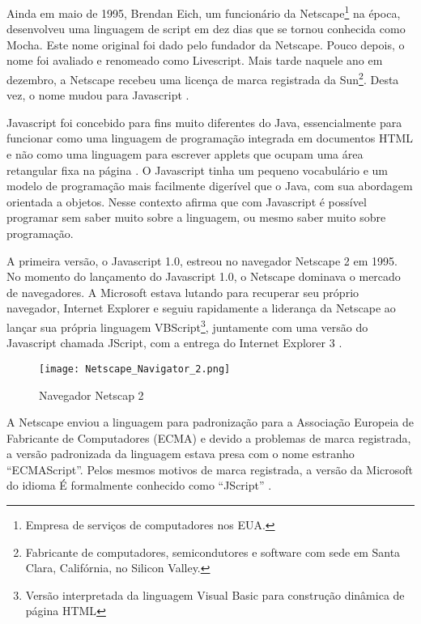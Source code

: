 Ainda em maio de 1995, Brendan Eich, um funcionário da Netscape\footnote{Empresa de serviços de computadores nos EUA.} na época, desenvolveu uma linguagem de script em dez dias que se tornou conhecida como Mocha. Este nome original foi dado pelo fundador da Netscape. Pouco depois, o nome foi avaliado e renomeado como Livescript. Mais tarde naquele ano em dezembro, a Netscape recebeu uma licença de marca registrada da Sun\footnote{Fabricante de computadores, semicondutores e software com sede em Santa Clara, Califórnia, no Silicon Valley.}. Desta vez, o nome mudou para Javascript \cite{neer2013history}.

Javascript foi concebido para fins muito diferentes do Java, essencialmente para funcionar como uma linguagem de programação integrada em documentos HTML e não como uma linguagem para escrever applets que ocupam uma área retangular fixa na página \cite{goodman2007javascript}. O Javascript tinha um pequeno vocabulário e um modelo de programação mais facilmente digerível que o Java, com sua abordagem orientada a objetos. Nesse contexto  afirma que com Javascript é possível programar sem saber muito sobre a linguagem, ou mesmo saber muito sobre programação.

A primeira versão, o Javascript 1.0, estreou no navegador Netscape 2 em 1995. No momento do lançamento do Javascript 1.0, o Netscape dominava o mercado de navegadores. A Microsoft estava lutando para recuperar seu próprio navegador, Internet Explorer e seguiu rapidamente a liderança da Netscape ao lançar sua própria linguagem VBScript\footnote{Versão interpretada da linguagem Visual Basic para construção dinâmica de página HTML}, juntamente com uma versão do Javascript chamada JScript, com a entrega do Internet Explorer 3 \cite{keith2010dom}.

\begin{figure}[!htb]
	\centering
	\texttt{[image: Netscape\_Navigator\_2.png]}
	\caption{Navegador Netscap 2}
	\label{fig:netscape}
\end{figure}

A Netscape enviou a linguagem para padronização para a Associação Europeia de Fabricante de Computadores (ECMA) e devido a problemas de marca registrada, a versão padronizada da linguagem estava presa com o nome estranho “ECMAScript”. Pelos mesmos motivos de marca registrada, a versão da Microsoft do idioma É formalmente conhecido como “JScript” \cite{flanagan2011javascript}.

